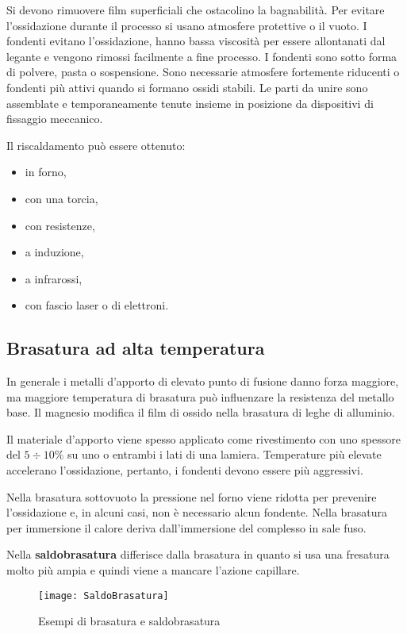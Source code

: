 Si devono rimuovere film superficiali che ostacolino la bagnabilità.
Per evitare l'ossidazione durante il processo si usano atmosfere protettive o il vuoto.
I fondenti evitano l'ossidazione, hanno bassa viscosità per essere allontanati dal legante e vengono rimossi facilmente a fine processo.
I fondenti sono sotto forma di polvere, pasta o sospensione.
Sono necessarie atmosfere fortemente riducenti o fondenti più attivi quando si formano ossidi stabili.
Le parti da unire sono assemblate e temporaneamente tenute insieme in posizione da dispositivi di fissaggio meccanico.

Il riscaldamento può essere ottenuto:
\begin{itemize}
\item in forno,
\item con una torcia,
\item con resistenze,
\item a induzione,
\item a infrarossi,
\item con fascio laser o di elettroni.
\end{itemize}

\subsection{Brasatura ad alta temperatura}
In generale i metalli d'apporto di elevato punto di fusione danno forza maggiore, ma maggiore temperatura di brasatura può influenzare la resistenza del metallo base.
Il magnesio modifica il film di ossido nella brasatura di leghe di alluminio.

Il materiale d'apporto viene spesso applicato come rivestimento con uno spessore del $5 \div 10\%$ su uno o entrambi i lati di una lamiera.
Temperature più elevate accelerano l'ossidazione, pertanto, i fondenti devono essere più aggressivi.

Nella brasatura sottovuoto la pressione nel forno viene ridotta per prevenire l'ossidazione e, in alcuni casi, non è necessario alcun fondente.
Nella brasatura per immersione il calore deriva dall'immersione del complesso in sale fuso.

Nella \textbf{saldobrasatura} differisce dalla brasatura in quanto si usa una fresatura molto più ampia e quindi viene a mancare l'azione capillare.

\begin{figure}
\centering
\texttt{[image: SaldoBrasatura]}
\caption{Esempi di brasatura e saldobrasatura}
\label{fig:SaldoBrasatura}
\end{figure}

